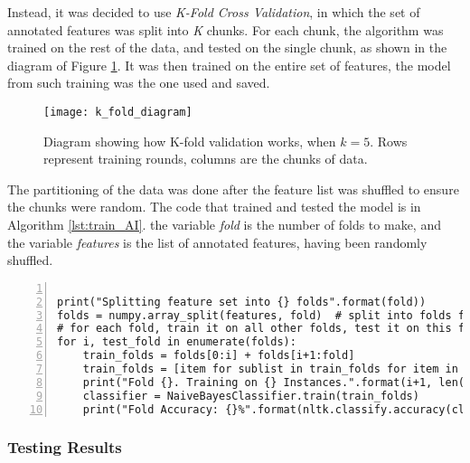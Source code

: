 Instead, it was decided to use \emph{K-Fold Cross Validation}\cite{Hastie2009}, in which the set of annotated features was split into \emph{K} chunks. For each chunk, the algorithm was trained on the rest of the data, and tested on the single chunk, as shown in the diagram of Figure \ref{fig:k_fold_diagram}. It was then trained on the entire set of features, the model from such training was the one used and saved.

\begin{figure}[ht]
\texttt{[image: k\_fold\_diagram]}
\caption{Diagram showing how K-fold validation works, when $k=5$. Rows represent training rounds, columns are the chunks of data.}
\label{fig:k_fold_diagram}
\end{figure}

The partitioning of the data was done after the feature list was shuffled to ensure the chunks were random. The code that trained and tested the model is in Algorithm \ref{lst:train_AI}. the variable \emph{fold} is the number of folds to make, and the variable \emph{features} is the list of annotated features, having been randomly shuffled.

\begin{lstlisting}[float=ht,
				   numbers=left,
				   caption={Snippet of code that trains and tests the classification algorithm},
				   label={lst:train_AI}]

print("Splitting feature set into {} folds".format(fold))
folds = numpy.array_split(features, fold)  # split into folds for training
# for each fold, train it on all other folds, test it on this fold
for i, test_fold in enumerate(folds):
    train_folds = folds[0:i] + folds[i+1:fold]
    train_folds = [item for sublist in train_folds for item in sublist] # flatten list
    print("Fold {}. Training on {} Instances.".format(i+1, len(train_folds)))
    classifier = NaiveBayesClassifier.train(train_folds)
    print("Fold Accuracy: {}%".format(nltk.classify.accuracy(classifier, test_fold)))
\end{lstlisting}

\subsubsection{Testing Results}
\label{sec:imp_AI_test_result}

